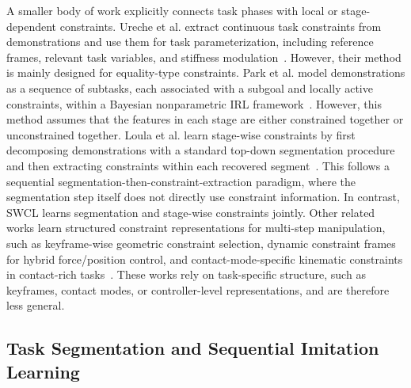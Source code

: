 \documentclass[lettersize,journal]{IEEEtran}
\begin{document}

A smaller body of work explicitly connects task phases with local or stage-dependent constraints. Ureche et al. extract continuous task constraints from demonstrations and use them for task parameterization, including reference frames, relevant task variables, and stiffness modulation~\cite{ureche2015task}. However, their method is mainly designed for equality-type constraints. Park et al. model demonstrations as a sequence of subtasks, each associated with a subgoal and locally active constraints, within a Bayesian nonparametric IRL framework~\cite{park2020cbnirl}. However, this method assumes that the features in each stage are either constrained together or unconstrained together. Loula et al. learn stage-wise constraints by first decomposing demonstrations with a standard top-down segmentation procedure and then extracting constraints within each recovered segment~\cite{loula2020constraint}. This follows a sequential segmentation-then-constraint-extraction paradigm, where the segmentation step itself does not directly use constraint information. In contrast, SWCL learns segmentation and stage-wise constraints jointly. Other related works learn structured constraint representations for multi-step manipulation, such as keyframe-wise geometric constraint selection, dynamic constraint frames for hybrid force/position control, and contact-mode-specific kinematic constraints in contact-rich tasks~\cite{perezdarpino2017clearn,conkey2019hybrid,hegeler2023contact}. These works rely on task-specific structure, such as keyframes, contact modes, or controller-level representations, and are therefore less general.

\subsection{Task Segmentation and Sequential Imitation Learning}
\end{document}
